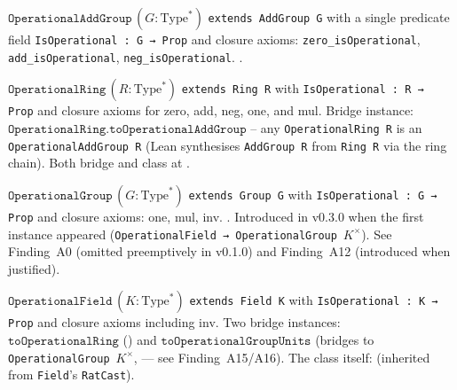 \begin{definition}
\label{def:OperationalAddGroup}
\leanok
{}
$\texttt{OperationalAddGroup}\,(G : \mathrm{Type}^*)$ \texttt{extends AddGroup G}
with a single predicate field \texttt{IsOperational : G → Prop} and closure
axioms: \texttt{zero\_isOperational}, \texttt{add\_isOperational},
\texttt{neg\_isOperational}.
\axiomprofile{[]}.
\end{definition}

\begin{definition}
\label{def:OperationalRing}
\leanok
{}
$\texttt{OperationalRing}\,(R : \mathrm{Type}^*)$ \texttt{extends Ring R}
with \texttt{IsOperational : R → Prop} and closure axioms for zero, add,
neg, one, and mul.  Bridge instance:
$\texttt{OperationalRing.toOperationalAddGroup}$ -- any \texttt{OperationalRing R}
is an \texttt{OperationalAddGroup R} (Lean synthesises \texttt{AddGroup R}
from \texttt{Ring R} via the ring chain).
Both bridge and class at \axiomprofile{[]}.
\end{definition}

\begin{definition}
\label{def:OperationalGroup}
\leanok
$\texttt{OperationalGroup}\,(G : \mathrm{Type}^*)$ \texttt{extends Group G}
with \texttt{IsOperational : G → Prop} and closure axioms: one, mul, inv.
\axiomprofile{[]}.
Introduced in v0.3.0 when the first instance appeared (\texttt{OperationalField
→ OperationalGroup}~$K^\times$).
See Finding~A0 (omitted preemptively in v0.1.0) and Finding~A12 (introduced
when justified).
\end{definition}

\begin{definition}
\label{def:OperationalField}
\leanok
{}
$\texttt{OperationalField}\,(K : \mathrm{Type}^*)$ \texttt{extends Field K}
with \texttt{IsOperational : K → Prop} and closure axioms including inv.
Two bridge instances:
$\texttt{toOperationalRing}$ ()
and $\texttt{toOperationalGroupUnits}$ (bridges to \texttt{OperationalGroup}~$K^\times$,
 --- see Finding~A15/A16).
The class itself:  (inherited from
\texttt{Field}'s \texttt{RatCast}).
\end{definition}

